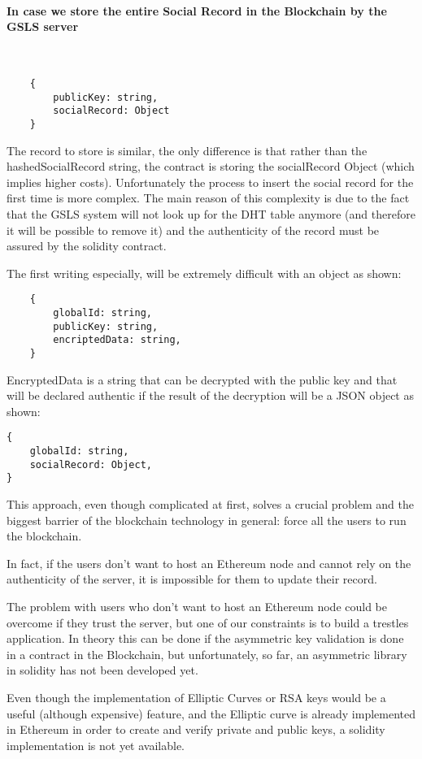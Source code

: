 \paragraph{In case we store the entire Social Record in the Blockchain by the GSLS server}\
\begin{lstlisting}
	{
		publicKey: string,
		socialRecord: Object
	}
\end{lstlisting}

The record to store is similar, the only difference is that rather than the hashedSocialRecord string, the contract is storing the socialRecord Object (which implies higher costs).
Unfortunately the process to insert the social record for the first time is more complex.
The main reason of this complexity is due to the fact that the GSLS system will not look up for the DHT table anymore (and therefore it will be possible to remove it) and the authenticity of the record must be assured by the solidity contract.

The first writing especially, will be extremely difficult with an object as shown:
\begin{lstlisting}
	{
		globalId: string,
		publicKey: string,
		encriptedData: string,
	}
\end{lstlisting}

EncryptedData is a string that can be decrypted with the public key and that will be declared authentic if the result of the decryption will be a JSON object as shown:
\begin{lstlisting}
{
	globalId: string,
	socialRecord: Object,
}
\end{lstlisting}

This approach, even though complicated at first, solves a crucial problem and the biggest barrier of the blockchain technology in general: force all the users to run the blockchain.

In fact, if the users don’t want to host an Ethereum node and cannot rely on the authenticity of the server, it is impossible for them to update their record.

The problem with users who don’t want to host an Ethereum node could be overcome if they trust the server, but one of our constraints is to build a trestles application. In theory this can be done if the asymmetric key validation is done in a contract in the Blockchain, but unfortunately, so far, an asymmetric library in solidity has not been developed yet.


Even though the implementation of Elliptic Curves or RSA keys would be a useful (although expensive) feature, and the Elliptic curve is already implemented in Ethereum in order to create and verify private and public keys, a solidity implementation is not yet available.

